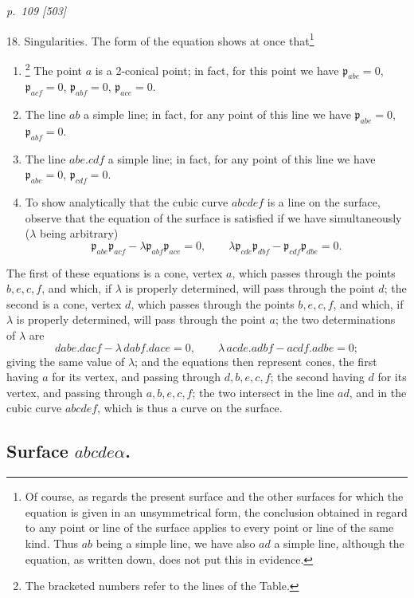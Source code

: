 \documentclass[11pt,a4paper]{article}
\newcommand{\sourcepage}[2]{%
  \bigskip
  \noindent\textit{p.~#1 [#2]}%
  \par\smallskip
}
\newcommand{\p}{\mathfrak p}
\begin{document}
\sourcepage{109}{503}
18. Singularities. The form of the equation shows at once that\footnote{Of course,
as regards the present surface and the other surfaces for which the equation is given
in an unsymmetrical form, the conclusion obtained in regard to any point or line of
the surface applies to every point or line of the same kind. Thus $ab$ being a simple
line, we have also $ad$ a simple line, although the equation, as written down, does
not put this in evidence.}
\begin{enumerate}
\item[(0)]\footnote{The bracketed numbers refer to the lines of the Table.} The
point $a$ is a 2-conical point; in fact, for this point we have
$\p_{abe}=0$, $\p_{acf}=0$, $\p_{abf}=0$, $\p_{ace}=0$.
\item[(1)] The line $ab$ a simple line; in fact, for any point of this line we have
$\p_{abe}=0$, $\p_{abf}=0$.
\item[(2)] The line $abe.cdf$ a simple line; in fact, for any point of this line we
have $\p_{abe}=0$, $\p_{cdf}=0$.
\item[(9)] To show analytically that the cubic curve $abcdef$ is a line on the
surface, observe that the equation of the surface is satisfied if we have simultaneously
($\lambda$ being arbitrary)
\[
\p_{abe}\p_{acf}-\lambda\p_{abf}\p_{ace}=0,\qquad
\lambda\p_{cde}\p_{dbf}-\p_{cdf}\p_{dbe}=0.
\]
\end{enumerate}
The first of these equations is a cone, vertex $a$, which passes through the points
$b,e,c,f$, and which, if $\lambda$ is properly determined, will pass through the point
$d$; the second is a cone, vertex $d$, which passes through the points $b,e,c,f$,
and which, if $\lambda$ is properly determined, will pass through the point $a$; the
two determinations of $\lambda$ are
\[
dabe.dacf-\lambda\,dabf.dace=0,\qquad
\lambda\,acde.adbf-acdf.adbe=0;
\]
giving the same value of $\lambda$; and the equations then represent cones, the first
having $a$ for its vertex, and passing through $d,b,e,c,f$; the second having $d$
for its vertex, and passing through $a,b,e,c,f$; the two intersect in the line $ad$,
and in the cubic curve $abcdef$, which is thus a curve on the surface.

\subsection*{Surface $abcde\alpha$.}
\end{document}
